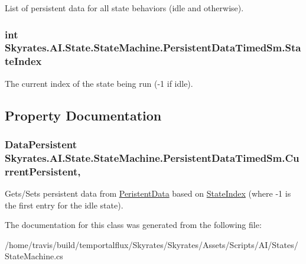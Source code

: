 List of persistent data for all state behaviors (idle and otherwise). 

\hypertarget{class_skyrates_1_1_a_i_1_1_state_1_1_state_machine_1_1_persistent_data_timed_sm_a5f1edf5fa67ab1b21219bb378f62f778}{
\subsubsection[{State\-Index}]{\setlength{\rightskip}{0pt plus 5cm}int Skyrates.\-A\-I.\-State.\-State\-Machine.\-Persistent\-Data\-Timed\-Sm.\-State\-Index}}\label{class_skyrates_1_1_a_i_1_1_state_1_1_state_machine_1_1_persistent_data_timed_sm_a5f1edf5fa67ab1b21219bb378f62f778}


The current index of the state being run (-\/1 if idle). 



\subsection{Property Documentation}
\hypertarget{class_skyrates_1_1_a_i_1_1_state_1_1_state_machine_1_1_persistent_data_timed_sm_a5d2f8683b0175d58351e64b40221a088}{
\subsubsection[{Current\-Persistent}]{\setlength{\rightskip}{0pt plus 5cm}Data\-Persistent Skyrates.\-A\-I.\-State.\-State\-Machine.\-Persistent\-Data\-Timed\-Sm.\-Current\-Persistent\hspace{0.3cm}{\ttfamily [get]}, {\ttfamily [set]}}}\label{class_skyrates_1_1_a_i_1_1_state_1_1_state_machine_1_1_persistent_data_timed_sm_a5d2f8683b0175d58351e64b40221a088}


Gets/\-Sets persistent data from \hyperlink{class_skyrates_1_1_a_i_1_1_state_1_1_state_machine_1_1_persistent_data_timed_sm_ad47deb6b3717c611995891f5f8bf3b08}{Peristent\-Data} based on \hyperlink{class_skyrates_1_1_a_i_1_1_state_1_1_state_machine_1_1_persistent_data_timed_sm_a5f1edf5fa67ab1b21219bb378f62f778}{State\-Index} (where -\/1 is the first entry for the idle state). 



The documentation for this class was generated from the following file\-:\begin{DoxyCompactItemize}
\item 
/home/travis/build/temportalflux/\-Skyrates/\-Skyrates/\-Assets/\-Scripts/\-A\-I/\-States/State\-Machine.\-cs\end{DoxyCompactItemize}
